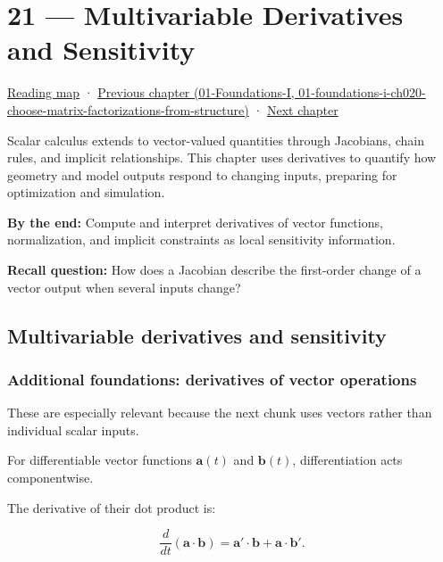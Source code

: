 \hypertarget{02-foundations-ii-ch021}{}
\chapter{21 --- Multivariable Derivatives and Sensitivity}\label{02-foundations-ii-ch021-multivariable-derivatives-and-sensitivity}

\hyperref[volume-reading-map]{Reading map} · \href{../01-Foundations-I/main.pdf\#nameddest=01-foundations-i-ch020-choose-matrix-factorizations-from-structure}{Previous chapter (01-Foundations-I, 01-foundations-i-ch020-choose-matrix-factorizations-from-structure)} · \hyperref[02-foundations-ii-ch022-accumulation-quadrature-and-the-bridge-to-probability]{Next chapter}

Scalar calculus extends to vector-valued quantities through Jacobians, chain rules, and implicit relationships. This chapter uses derivatives to quantify how geometry and model outputs respond to changing inputs, preparing for optimization and simulation.

\textbf{By the end:} Compute and interpret derivatives of vector functions, normalization, and implicit constraints as local sensitivity information.

\textbf{Recall question:} How does a Jacobian describe the first-order change of a vector output when several inputs change?

\section{Multivariable derivatives and sensitivity}\label{02-foundations-ii-ch021-multivariable-derivatives-and-sensitivity-1}

\subsection{Additional foundations: derivatives of vector operations}\label{02-foundations-ii-ch021-additional-foundations-derivatives-of-vector-operations}

These are especially relevant because the next chunk uses vectors rather than individual scalar inputs.

For differentiable vector functions \(\mathbf a(t)\) and \(\mathbf b(t)\), differentiation acts componentwise.

The derivative of their dot product is:

\[
\frac d{dt}(\mathbf a\cdot\mathbf b) =\mathbf a'\cdot\mathbf b+\mathbf a\cdot\mathbf b'.
\]


